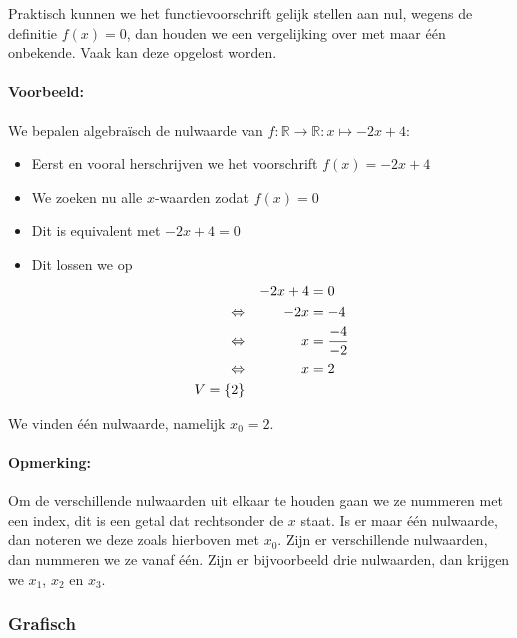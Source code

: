 \documentclass[12pt,a4paper,twoside]{article}
\begin{document}
Praktisch kunnen we het functievoorschrift gelijk stellen aan nul, wegens de definitie $f(x)=0$, dan houden we een vergelijking over met maar één onbekende. Vaak kan deze opgelost worden.

\paragraph{Voorbeeld:} We bepalen algebraïsch de nulwaarde van $f:\mathbb{R}\to\mathbb{R}:x\mapsto-2x+4$:

\begin{itemize}
\item Eerst en vooral herschrijven we het voorschrift $f(x)=-2x+4$
\item We zoeken nu alle $x$-waarden zodat $f(x)=0$
\item Dit is equivalent met $-2x+4=0$
\item Dit lossen we op
  \begin{alignat*}{2}
    && -2x+4 &= 0\\
    \Leftrightarrow &&   -2x &= -4\\
    \Leftrightarrow &&    x &= \dfrac{-4}{-2}\\
    \Leftrightarrow &&    x &= 2\\
    V=\{2\}
  \end{alignat*}
\end{itemize}

We vinden één nulwaarde, namelijk $x_0=2$.

\paragraph*{Opmerking:} Om de verschillende nulwaarden uit elkaar te houden gaan we ze nummeren met een index, dit is een getal dat rechtsonder de $x$ staat. Is er maar één nulwaarde, dan noteren we deze zoals hierboven met $x_0$. Zijn er verschillende nulwaarden, dan nummeren we ze vanaf één. Zijn er bijvoorbeeld drie nulwaarden, dan krijgen we $x_1$, $x_2$ en $x_3$.

\subsubsection*{Grafisch}
\end{document}
